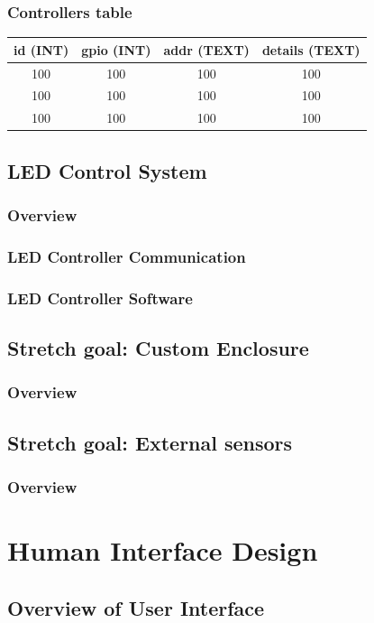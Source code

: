 \documentclass[onecolumn, draftclsnofoot,10pt, compsoc]{IEEEtran}
\begin{document}
			\subsubsection{Controllers table}
				\begin{tabular}{ |c|c|c|c| }
					\hline
					id (INT) & gpio (INT) & addr (TEXT) & details (TEXT) \\
					\hline
					100 & 100 & 100 & 100 \\
					100 & 100 & 100 & 100 \\
					100 & 100 & 100 & 100 \\
					\hline
				\end{tabular}


		\subsection{LED Control System}
			\subsubsection{Overview}
			\subsubsection{LED Controller Communication}
			\subsubsection{LED Controller Software}

		\subsection{Stretch goal: Custom Enclosure}
			\subsubsection{Overview}
		\subsection{Stretch goal: External sensors}
			\subsubsection{Overview}

	\section{Human Interface Design}
		\subsection{Overview of User Interface}
\end{document}
